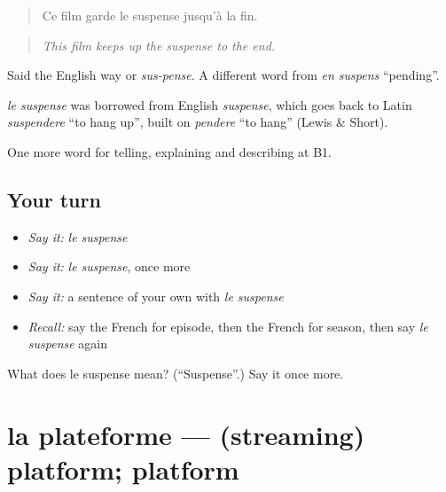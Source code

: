 \begin{quote}
Ce film garde le suspense jusqu'à la fin.
\end{quote}

\begin{quote}
\emph{This film keeps up the suspense to the end.}
\end{quote}

Said the English way or \emph{sus-pense}. A different word from \emph{en suspens} \textquotedblleft{}pending\textquotedblright{}.

\begin{cousinweb}
\emph{le suspense} was borrowed from English \emph{suspense}, which goes back to Latin \emph{suspendere} \textquotedblleft{}to hang up\textquotedblright{}, built on \emph{pendere} \textquotedblleft{}to hang\textquotedblright{} (Lewis \& Short).
\end{cousinweb}

\begin{grammarlens}[title={What you've built}]
One more word for telling, explaining and describing at B1.
\end{grammarlens}

\subsection*{Your turn}
\begin{itemize}
\raggedright
  \item \emph{Say it:} \emph{le suspense}
  \item \emph{Say it:} \emph{le suspense}, once more
  \item \emph{Say it:} a sentence of your own with \emph{le suspense}
  \item \emph{Recall:} say the French for episode, then the French for season, then say \emph{le suspense} again
\end{itemize}

\begin{tcolorbox}[breakable,colback=teal!4,colframe=teal!35!black,title={Before you move on}]
What does le suspense mean? (\textquotedblleft{}Suspense\textquotedblright{}.) Say it once more.
\end{tcolorbox}
\section[la plateforme]{la plateforme — (streaming) platform; platform}

\label{lesson:FR-C523-plateforme}



